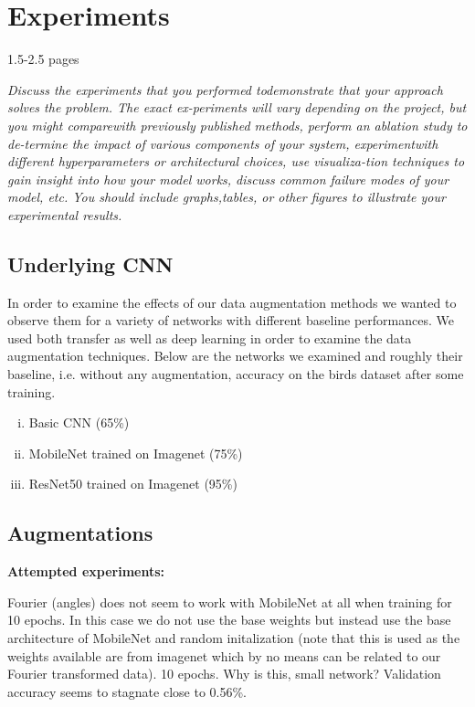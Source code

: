 \documentclass{article}
\begin{document}
\section{Experiments}

1.5-2.5 pages

\textit{Discuss the experiments that you performed todemonstrate  that  your  approach  solves  the  problem.   The  exact  ex-periments will vary depending on the project, but you might comparewith previously published methods, perform an ablation study to de-termine the impact of various components of your system, experimentwith different hyperparameters or architectural choices, use visualiza-tion  techniques  to  gain  insight  into  how  your  model  works,  discuss common failure modes of your model, etc.  You should include graphs,tables, or other figures to illustrate your experimental results.}

\subsection{Underlying CNN}

In order to examine the effects of our data augmentation methods we wanted to observe them for a variety of networks with different baseline performances. We used both transfer as well as deep learning in order to examine the data augmentation techniques. Below are the networks we examined and roughly their baseline, i.e. without any augmentation, accuracy on the birds dataset after some training.

\begin{enumerate}[(i)]
 \item Basic CNN (65\%)
 \item MobileNet trained on Imagenet (75\%)
 \item ResNet50 trained on Imagenet (95\%)
\end{enumerate}

\subsection{Augmentations}

\textbf{Attempted experiments:}

Fourier (angles) does not seem to work with MobileNet at all when training for 10 epochs. In this case we do not use the base weights but instead use the base architecture of MobileNet and random initalization (note that this is used as the weights available are from imagenet which by no means can be related to our Fourier transformed data). 10 epochs. Why is this, small network? Validation accuracy seems to stagnate close to 0.56\%.
\end{document}

